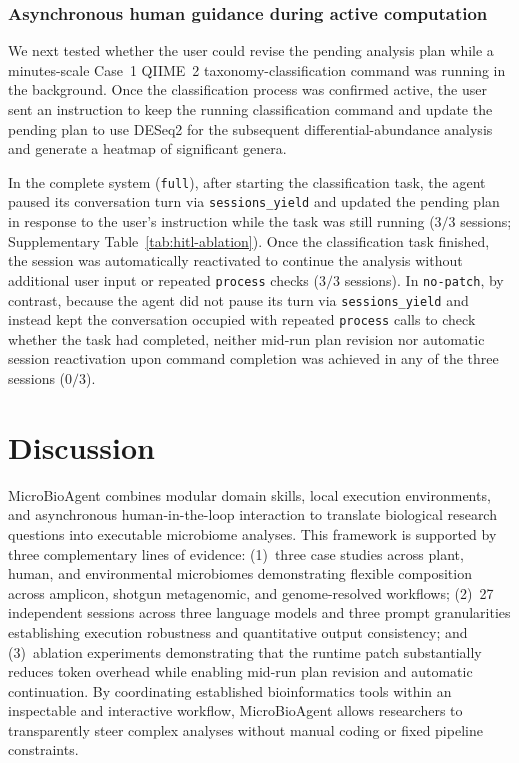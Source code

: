 \documentclass[10pt,letterpaper]{article}
\begin{document}
\subsubsection{Asynchronous human guidance during active computation}

We next tested whether the user could revise the pending analysis plan while
a minutes-scale Case~1 QIIME~2 taxonomy-classification command was running in
the background.  Once the classification process was confirmed active, the
user sent an instruction to keep the running classification command and
update the pending plan to use DESeq2 for the subsequent
differential-abundance analysis and generate a heatmap of significant genera.

In the complete system (\texttt{full}), after starting the classification
task, the agent paused its conversation turn via \texttt{sessions\_\-yield}
and updated the pending plan in response to the user's instruction while the
task was still running ($3/3$ sessions; Supplementary Table~\ref{tab:hitl-ablation}).  Once the
classification task finished, the session was automatically reactivated to
continue the analysis without additional user input or repeated
\texttt{process} checks ($3/3$ sessions).  In \texttt{no-patch}, by contrast,
because the agent did not pause its turn via \texttt{sessions\_\-yield} and
instead kept the conversation occupied with repeated \texttt{process} calls to
check whether the task had completed, neither mid-run plan revision nor
automatic session reactivation upon command completion was achieved in any of
the three sessions ($0/3$).

\FloatBarrier

\section{Discussion}
\label{sec:discussion}

MicroBioAgent combines modular domain skills, local execution environments,
and asynchronous human-in-the-loop interaction to translate biological
research questions into executable microbiome analyses.  This framework is
supported by three complementary lines of evidence: (1)~three case studies
across plant, human, and environmental microbiomes demonstrating flexible
composition across amplicon, shotgun metagenomic, and genome-resolved
workflows; (2)~27 independent sessions across three language models and
three prompt granularities establishing execution robustness and quantitative
output consistency; and (3)~ablation experiments demonstrating that the
runtime patch substantially reduces token overhead while enabling mid-run
plan revision and automatic continuation.  By coordinating established
bioinformatics tools within an inspectable and interactive workflow,
MicroBioAgent allows researchers to transparently steer complex analyses
without manual coding or fixed pipeline constraints.
\end{document}
